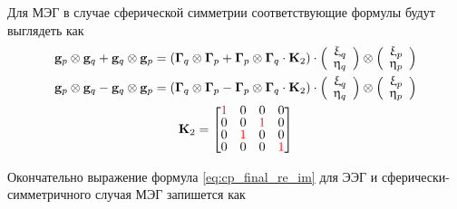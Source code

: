 Для МЭГ в случае сферической симметрии соответствующие формулы будут выглядеть как
\begin{gather}
    \mathbf{g}_p \otimes \mathbf{g}_q + \mathbf{g}_q \otimes \mathbf{g}_p =
    \left(
        \mathbf{\Gamma}_q
        \otimes
        \mathbf{\Gamma}_p
        +
        \mathbf{\Gamma}_p
        \otimes
        \mathbf{\Gamma}_q
        \cdot
        \mathbf{K}_2
    \right)
    \cdot
    \left(\begin{array}{ccc}
            \xi_q\\
            \eta_q\\
        \end{array}
    \right)
    \otimes
    \left(\begin{array}{ccc}
            \xi_p\\
            \eta_p\\
        \end{array}
    \right) \\
    \mathbf{g}_p \otimes \mathbf{g}_q - \mathbf{g}_q \otimes \mathbf{g}_p =
    \left(
        \mathbf{\Gamma}_q
        \otimes
        \mathbf{\Gamma}_p
        -
        \mathbf{\Gamma}_p
        \otimes
        \mathbf{\Gamma}_q
        \cdot
        \mathbf{K}_2
    \right)
    \cdot
    \left(\begin{array}{ccc}
            \xi_q\\
            \eta_q\\
        \end{array}
    \right)
    \otimes
    \left(\begin{array}{ccc}
            \xi_p\\
            \eta_p\\
        \end{array}
    \right) \\
    \renewcommand{\arraystretch}{0.8}
    \mathbf{K}_2 =
    \begin{bmatrix}
        \textcolor{red}{1} & 0 & 0 & 0 \\
        0 & 0 & \textcolor{red}{1} & 0 \\
        0 & \textcolor{red}{1} & 0 & 0 \\
        0 & 0 & 0 & \textcolor{red}{1}
    \end{bmatrix}
\end{gather}

Окончательно выражение формула \ref{eq:cp_final_re_im} для ЭЭГ и
сферически-симметричного случая МЭГ запишется как

